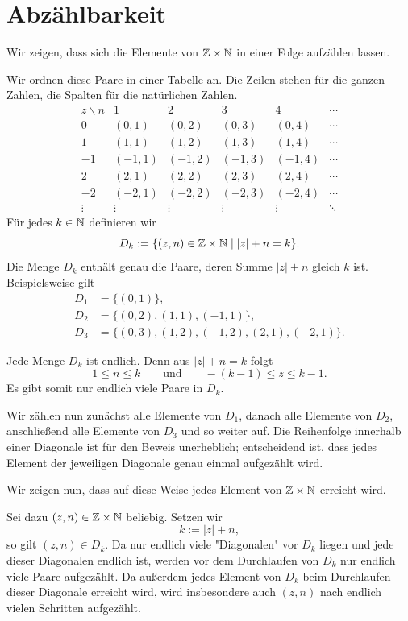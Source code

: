 \documentclass{report}
\begin{document}
\section{Abzählbarkeit}



\sol Wir zeigen, dass sich die Elemente von \(\mathbb{Z} \times \mathbb{N}\) in einer Folge aufzählen lassen.

Wir ordnen diese Paare in einer Tabelle an. Die Zeilen stehen für die ganzen Zahlen, die Spalten für die natürlichen Zahlen.
\[
\begin{array}{c|ccccc}
z\backslash n & 1&2&3&4&\cdots\\ \hline
0  &(0,1)&(0,2)&(0,3)&(0,4)&\cdots\\
1  &(1,1)&(1,2)&(1,3)&(1,4)&\cdots\\
-1 &(-1,1)&(-1,2)&(-1,3)&(-1,4)&\cdots\\
2  &(2,1)&(2,2)&(2,3)&(2,4)&\cdots\\
-2 &(-2,1)&(-2,2)&(-2,3)&(-2,4)&\cdots\\
\vdots&\vdots&\vdots&\vdots&\vdots&\ddots
\end{array}
\]
Für jedes \(k\in\mathbb{N}\) definieren wir
\[
D_k:=\{(z,n)\in\mathbb{Z}\times\mathbb{N}\mid |z|+n=k\}.
\]
Die Menge \(D_k\) enthält genau die Paare, deren Summe \(|z|+n\)
gleich \(k\) ist. Beispielsweise gilt
\begin{align*}
D_1&=\{(0,1)\},\\
D_2&=\{(0,2),(1,1),(-1,1)\},\\
D_3&=\{(0,3),(1,2),(-1,2),(2,1),(-2,1)\}.
\end{align*}

Jede Menge \(D_k\) ist endlich. Denn aus \(|z|+n=k\) folgt
\[
1\le n\le k
\qquad\text{und}\qquad
-(k-1)\le z\le k-1.
\]
Es gibt somit nur endlich viele Paare in \(D_k\).

Wir zählen nun zunächst alle Elemente von \(D_1\), danach alle Elemente von \(D_2\), anschließend alle Elemente von \(D_3\) und so weiter auf. Die Reihenfolge innerhalb einer Diagonale ist für den Beweis unerheblich; entscheidend ist, dass jedes Element der jeweiligen Diagonale genau einmal aufgezählt wird.

Wir zeigen nun, dass auf diese Weise jedes Element von
\(\mathbb{Z}\times\mathbb{N}\) erreicht wird.

Sei dazu \((z,n)\in\mathbb{Z}\times\mathbb{N}\) beliebig. Setzen wir
\[
k:=|z|+n,
\]
so gilt \((z,n)\in D_k\). Da nur endlich viele "Diagonalen" vor \(D_k\) liegen und jede dieser Diagonalen endlich ist, werden vor dem Durchlaufen von \(D_k\) nur endlich viele Paare aufgezählt. Da außerdem jedes Element von \(D_k\) beim Durchlaufen dieser Diagonale erreicht wird, wird insbesondere auch \((z,n)\) nach endlich vielen Schritten aufgezählt.
\end{document}
